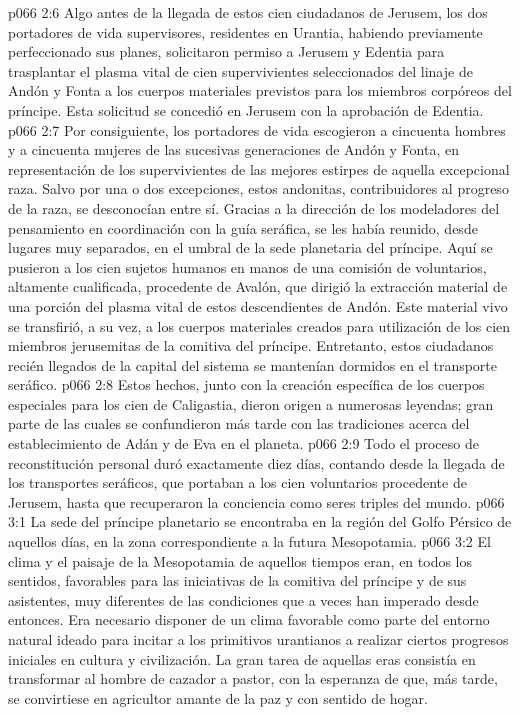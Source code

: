 \vs p066 2:6 \pc Algo antes de la llegada de estos cien ciudadanos de Jerusem, los dos portadores de vida supervisores, residentes en Urantia, habiendo previamente perfeccionado sus planes, solicitaron permiso a Jerusem y Edentia para trasplantar el plasma vital de cien supervivientes seleccionados del linaje de Andón y Fonta a los cuerpos materiales previstos para los miembros corpóreos del príncipe. Esta solicitud se concedió en Jerusem con la aprobación de Edentia.
\vs p066 2:7 Por consiguiente, los portadores de vida escogieron a cincuenta hombres y a cincuenta mujeres de las sucesivas generaciones de Andón y Fonta, en representación de los supervivientes de las mejores estirpes de aquella excepcional raza. Salvo por una o dos excepciones, estos andonitas, contribuidores al progreso de la raza, se desconocían entre sí. Gracias a la dirección de los modeladores del pensamiento en coordinación con la guía seráfica, se les había reunido, desde lugares muy separados, en el umbral de la sede planetaria del príncipe. Aquí se pusieron a los cien sujetos humanos en manos de una comisión de voluntarios, altamente cualificada, procedente de Avalón, que dirigió la extracción material de una porción del plasma vital de estos descendientes de Andón. Este material vivo se transfirió, a su vez, a los cuerpos materiales creados para utilización de los cien miembros jerusemitas de la comitiva del príncipe. Entretanto, estos ciudadanos recién llegados de la capital del sistema se mantenían dormidos en el transporte seráfico.
\vs p066 2:8 \pc Estos hechos, junto con la creación específica de los cuerpos especiales para los cien de Caligastia, dieron origen a numerosas leyendas; gran parte de las cuales se confundieron más tarde con las tradiciones acerca del establecimiento de Adán y de Eva en el planeta.
\vs p066 2:9 Todo el proceso de reconstitución personal duró exactamente diez días, contando desde la llegada de los transportes seráficos, que portaban a los cien voluntarios procedente de Jerusem, hasta que recuperaron la conciencia como seres triples del mundo.
\vs p066 3:1 La sede del príncipe planetario se encontraba en la región del Golfo Pérsico de aquellos días, en la zona correspondiente a la futura Mesopotamia.
\vs p066 3:2 El clima y el paisaje de la Mesopotamia de aquellos tiempos eran, en todos los sentidos, favorables para las iniciativas de la comitiva del príncipe y de sus asistentes, muy diferentes de las condiciones que a veces han imperado desde entonces. Era necesario disponer de un clima favorable como parte del entorno natural ideado para incitar a los primitivos urantianos a realizar ciertos progresos iniciales en cultura y civilización. La gran tarea de aquellas eras consistía en transformar al hombre de cazador a pastor, con la esperanza de que, más tarde, se convirtiese en agricultor amante de la paz y con sentido de hogar.
